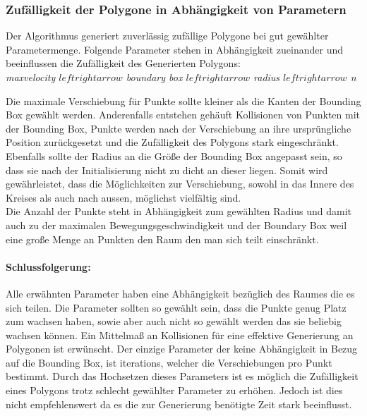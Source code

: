   \subsubsection{Zufälligkeit der Polygone in Abhängigkeit von Parametern}
    Der Algorithmus generiert zuverlässig zufällige Polygone bei gut
    gewählter Parametermenge.
    Folgende Parameter stehen in Abhängigkeit zueinander und beeinflussen die 
    Zufälligkeit des Generierten Polygons:\\
    \textit{maxvelocity $leftrightarrow$ boundary box $leftrightarrow$ radius $leftrightarrow$ n}

    Die maximale Verschiebung für Punkte sollte kleiner als die Kanten der 
    Bounding Box gewählt werden. Anderenfalls entstehen gehäuft Kollisionen 
    von Punkten mit der Bounding Box, Punkte werden nach der Verschiebung an 
    ihre ursprüngliche Position zurückgesetzt und die Zufälligkeit des Polygons 
    stark eingeschränkt.
    Ebenfalls sollte der Radius an die Größe der Bounding Box angepasst sein, so dass sie nach der Initialisierung nicht zu dicht an dieser liegen. Somit wird gewährleistet, dass die Möglichkeiten zur Verschiebung, sowohl in das Innere des Kreises als auch nach aussen, möglichst vielfältig sind.\\
    Die Anzahl der Punkte steht in Abhängigkeit zum gewählten Radius und damit 
    auch zu der maximalen Bewegungsgeschwindigkeit und der Boundary Box 
    weil eine große Menge an Punkten den Raum den man sich teilt 
    einschränkt.
    \paragraph{Schlussfolgerung:}
    Alle erwähnten Parameter haben eine Abhängigkeit bezüglich des Raumes 
    die es sich teilen. Die Parameter sollten so gewählt sein, dass die 
    Punkte genug Platz zum wachsen haben, sowie aber auch nicht so gewählt 
    werden das sie beliebig wachsen können. Ein Mittelmaß an Kollisionen 
    für eine effektive Generierung an Polygonen ist erwünscht.
    Der einzige Parameter der keine Abhängigkeit in Bezug auf die Bounding Box, 
    ist iterations, welcher die Verschiebungen pro Punkt bestimmt.
    Durch das Hochsetzen dieses Parameters ist 
    es möglich die Zufälligkeit eines Polygons trotz schlecht gewählter 
    Parameter zu erhöhen. 
    Jedoch ist dies nicht empfehlenswert da es die 
    zur Generierung benötigte Zeit stark beeinflusst.  

  
